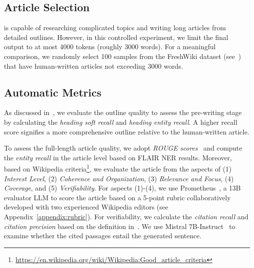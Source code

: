 \label{sec:exp}
\subsection{Article Selection}
\system is capable of researching complicated topics and writing long articles from detailed outlines. However, in this controlled experiment, we limit the final output to at most 4000 tokens (roughly 3000 words). For a meaningful comparison, we randomly select 100 samples from the FreshWiki dataset (see~) that have human-written articles not exceeding 3000 words.%

\subsection{Automatic Metrics}
\label{sec:automatic_metrics}
As discussed in~, we evaluate the outline quality %
to assess the pre-writing stage by calculating the \textit{heading soft recall} and \textit{heading entity recall}. %
A higher recall score signifies a more comprehensive outline relative to the human-written article.

To assess the full-length article quality, %
we adopt \textit{ROUGE scores}~\citep{lin-2004-rouge} and compute the \textit{entity recall} in the article level based on FLAIR NER results. %
Moreover, based on Wikipedia criteria\footnote{\url{https://en.wikipedia.org/wiki/Wikipedia:Good_article_criteria}}, we evaluate the article from the aspects of (1) \textit{Interest Level}, (2) \textit{Coherence and Organization}, (3) \textit{Relevance and Focus}, (4) \textit{Coverage}, and (5) \textit{Verifiability}. 
For aspects (1)-(4), we use Prometheus~\citep{kim2023prometheus}, a 13B evaluator LLM to score the article based on a 5-point rubric collaboratively developed with two experienced Wikipedia editors (see Appendix~\ref{appendix:rubric}). For verifiability, we calculate the \textit{citation recall} and \textit{citation precision} based on the definition in~\citet{gao-etal-2023-enabling}. We use Mistral 7B-Instruct~\citep{jiang2023mistral} to examine whether the cited passages entail the generated sentence.






